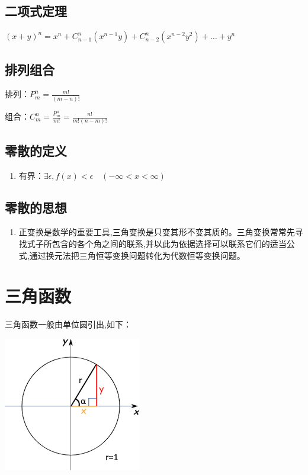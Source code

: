 \documentclass[UTF8]{ctexbook}
\newcommand{\mathCombination}[2]{C_{#1}^{#2}}
\newcommand{\mathPermutation}[2]{P_{#1}^{#2}}
\begin{document}
{{\subsection{二项式定理}{
  $(x + y)^n = x^n + \mathCombination{n - 1}{n}(x^{n-1} y) + \mathCombination{n - 2}{n}(x^{n-2} y^2) + \dots + y^n$
}

\subsection{排列组合}{
  排列：$\mathPermutation{m}{n} = \frac{m!}{(m-n)!}$

  组合：$\mathCombination{m}{n} = \frac{\mathPermutation{m}{n}}{m!} = \frac{n!}{m!(n-m)!}$
}

\subsection{零散的定义}{
  \begin{enumerate}
    \item 有界：$\exists\epsilon,f(x) < \epsilon\quad(-\infty < x < \infty )$
  \end{enumerate}
}

\subsection{零散的思想}{
  \begin{enumerate}
    \item 正变换是数学的重要工具,三角变换是只变其形不变其质的。三角变换常常先寻找式子所包含的各个角之间的联系,并以此为依据选择可以联系它们的适当公式,通过换元法把三角恒等变换问题转化为代数恒等变换问题。
  \end{enumerate}
}
}

\section{三角函数}{
三角函数一般由单位圆引出,如下：

\includegraphics{resources/UnitCircle.png}

}}
\end{document}
